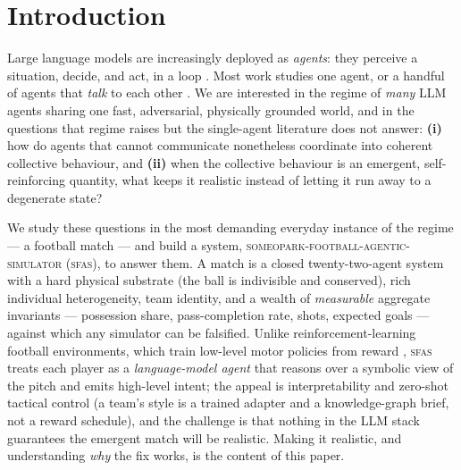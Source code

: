 \documentclass[11pt]{article}
\theoremstyle{definition}
\theoremstyle{remark}
\newcommand{\sfas}{\textsc{sfas}}
\begin{document}
\section{Introduction}\label{sec:intro}

Large language models are increasingly deployed as \emph{agents}: they perceive a situation, decide, and act, in a loop \citep{park2023,wang2023survey,yao2023}. Most work studies one agent, or a handful of agents that \emph{talk} to each other \citep{li2023camel}. We are interested in the regime of \emph{many} LLM agents sharing one fast, adversarial, physically grounded world, and in the questions that regime raises but the single-agent literature does not answer: \textbf{(i)} how do agents that cannot communicate nonetheless coordinate into coherent collective behaviour, and \textbf{(ii)} when the collective behaviour is an emergent, self-reinforcing quantity, what keeps it realistic instead of letting it run away to a degenerate state?

We study these questions in the most demanding everyday instance of the regime --- a football match --- and build a system, \textsc{someopark-football-agentic-simulator} (\sfas), to answer them. A match is a closed twenty-two-agent system with a hard physical substrate (the ball is indivisible and conserved), rich individual heterogeneity, team identity, and a wealth of \emph{measurable} aggregate invariants --- possession share, pass-completion rate, shots, expected goals --- against which any simulator can be falsified. Unlike reinforcement-learning football environments, which train low-level motor policies from reward \citep{kurach2020,kitano1997}, \sfas{} treats each player as a \emph{language-model agent} that reasons over a symbolic view of the pitch and emits high-level intent; the appeal is interpretability and zero-shot tactical control (a team's style is a trained adapter and a knowledge-graph brief, not a reward schedule), and the challenge is that nothing in the LLM stack guarantees the emergent match will be realistic. Making it realistic, and understanding \emph{why} the fix works, is the content of this paper.
\end{document}
